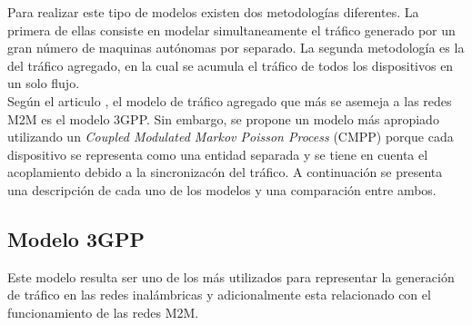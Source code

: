 \documentclass[journal]{IEEEtran}
\begin{document}
Para realizar este tipo de modelos existen dos metodologías diferentes. La primera de ellas consiste en modelar simultaneamente el tráfico generado por un gran número de maquinas autónomas por separado. La segunda metodología es la del tráfico agregado, en la cual se acumula el tráfico de todos los dispositivos en un solo flujo.\\
 
Según el articulo \cite{art3}, el modelo de tr\'afico agregado que m\'as se asemeja a las redes M2M es el modelo 3GPP. Sin embargo, se propone un modelo m\'as apropiado utilizando un \emph{Coupled Modulated Markov Poisson Process} (CMPP) porque cada dispositivo se representa como una entidad separada y se tiene en cuenta el acoplamiento debido a la sincronizac\'on del tr\'afico. A continuaci\'on se presenta una descripci\'on de cada uno de los modelos y una comparaci\'on entre ambos.
\subsection{Modelo 3GPP}
Este modelo resulta ser uno de los m\'as utilizados para representar la generaci\'on de tr\'afico en las redes inal\'ambricas y adicionalmente esta relacionado con el funcionamiento de las redes M2M.\\
\end{document}
